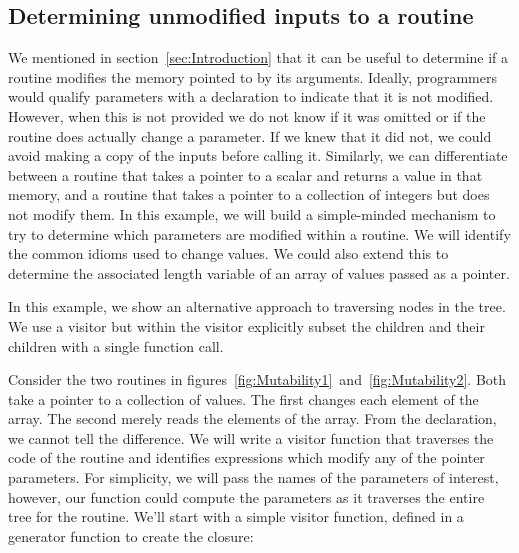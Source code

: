 \subsection{Determining unmodified inputs to a routine}\label{sec:MutabilityEg}

We mentioned in section~\ref{sec:Introduction} that it can be useful
to determine if a routine modifies the memory pointed to by its
arguments.  Ideally, programmers would qualify parameters with a
 declaration to indicate that it is not
modified. However, when this is not provided we do not know if it was
omitted or if the routine does actually change a parameter.  If we
knew that it did not, we could avoid making a copy of the inputs
before calling it.  Similarly, we can differentiate between a routine
that takes a pointer to a scalar  and returns a value in
that memory, and a routine that takes a pointer to a collection of
integers but does not modify them.  In this example, we will build a
simple-minded mechanism to try to determine which parameters are
modified within a routine. We will identify the common idioms used to
change values. We could also extend this to determine the associated length
variable of an array of values passed as a pointer.




In this example, we show an alternative approach to traversing nodes
in the tree. We use a visitor but within the visitor explicitly
subset the children and their children with a single function call.

Consider the two routines in
figures~\ref{fig:Mutability1}~and~\ref{fig:Mutability2}.  Both take a
pointer to a collection of  values.  The first changes
each element of the array. The second merely reads the elements of the
array. From the declaration, we cannot tell the difference.  We will
write a visitor function that traverses the code of the routine and
identifies expressions which modify any of the pointer parameters.
For simplicity, we will pass the names of the parameters of
interest, however, our function could compute the parameters as it
traverses the entire tree for the routine.  We'll start with a simple
visitor function, defined in a generator function to create the
closure:

